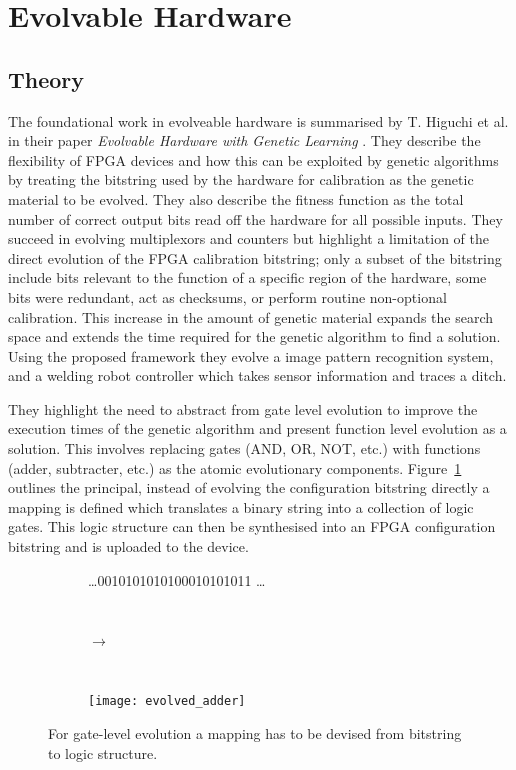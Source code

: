 \section{Evolvable Hardware}

\subsection{Theory}
The foundational work in evolveable hardware is summarised by T. Higuchi et al. in their
paper {\em Evolvable Hardware with Genetic Learning} \cite{541893}. They describe
the flexibility of FPGA devices and how this can be exploited by genetic algorithms
by treating the bitstring used by the hardware for calibration as the genetic material
to be evolved. They also describe the fitness function as the total number of correct
output bits read off the hardware for all possible inputs. They succeed in evolving multiplexors and
counters but highlight a limitation of the direct evolution of the FPGA calibration
bitstring; only a subset of the bitstring include bits relevant to the function
of a specific region of the hardware, some bits were redundant, act as checksums, or
perform routine non-optional calibration. This increase in the amount of genetic
material expands the search space and extends the time required for the genetic algorithm to find a solution.
Using the proposed framework they evolve a image pattern recognition system,
and a welding robot controller which takes sensor information and traces a ditch.

They highlight the need to abstract from gate level evolution to improve the
execution times of the genetic algorithm and present function level evolution
as a solution. This involves replacing gates (AND, OR, NOT, etc.) with functions
(adder, subtracter, etc.) as the atomic evolutionary components. Figure~\ref{fig:mapping}
outlines the principal, instead of evolving the configuration bitstring directly
a mapping is defined which translates a binary string into a collection of
logic gates. This logic structure can then be synthesised into an FPGA configuration
bitstring and is uploaded to the device.

\begin{figure}
	\centering
	\begin{subfigure}[ht]{0.4\textwidth}
		\centering
		\ldots 0010101010100010101011 \ldots
	\end{subfigure}
	~
	\begin{subfigure}[ht]{0.1\textwidth}
		$\rightarrow$
	\end{subfigure}
	~
	\begin{subfigure}[ht]{0.4\textwidth}
		\texttt{[image: evolved\_adder]}
	\end{subfigure}
	\caption{For gate-level evolution a mapping has to be devised from bitstring to logic structure.}
	\label{fig:mapping}
\end{figure}

